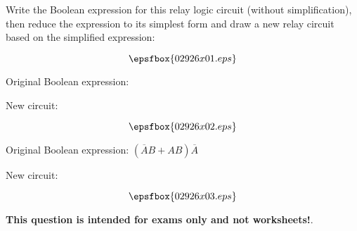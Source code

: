 

Write the Boolean expression for this relay logic circuit (without simplification), then reduce the expression to its simplest form and draw a new relay circuit based on the simplified expression:

$$\epsfbox{02926x01.eps}$$

Original Boolean expression:

\vskip 10pt

New circuit:

$$\epsfbox{02926x02.eps}$$







Original Boolean expression: $(\overline{A}B + AB)\overline{A}$

\vskip 10pt

New circuit:

$$\epsfbox{02926x03.eps}$$







{\bf This question is intended for exams only and not worksheets!}.




